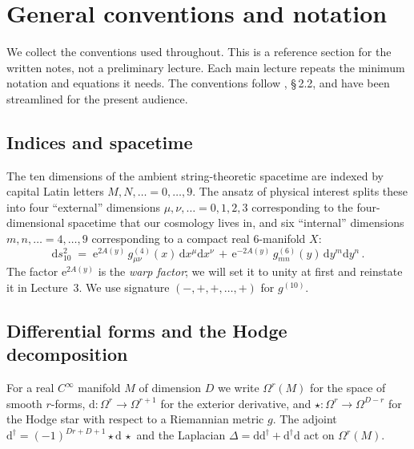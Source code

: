 
\section{General conventions and notation}\label{sec:conventions}


We collect the conventions used throughout. This is a reference
section for the written notes, not a preliminary lecture. Each main
lecture repeats the minimum notation and equations it needs. The
conventions follow \cite{McAllister:2025qwq}, \S\,2.2, and have
been streamlined for the present audience.

\subsection{Indices and spacetime}

The ten dimensions of the ambient string-theoretic spacetime are
indexed by capital Latin letters $M,N,\ldots = 0,\ldots,9$. The
ansatz of physical interest splits these into four ``external''
dimensions $\mu,\nu,\ldots = 0,1,2,3$ corresponding to the
four-dimensional spacetime that our cosmology lives in, and six
``internal'' dimensions $m,n,\ldots = 4,\ldots,9$ corresponding to a
compact real $6$-manifold $X$:
\begin{equation}\label{eq:ansatz}
    \mathrm{d}s^2_{10} \;=\; \mathrm{e}^{2A(y)}\, g^{(4)}_{\mu\nu}(x)\,\mathrm{d}x^\mu \mathrm{d}x^\nu
        \,+\, \mathrm{e}^{-2A(y)}\,g^{(6)}_{mn}(y)\,\mathrm{d}y^m \mathrm{d}y^n \,.
\end{equation}
The factor $\mathrm{e}^{2A(y)}$ is the \emph{warp factor}; we will set it to
unity at first and reinstate it in Lecture~3. We use signature
$(-,+,+,\ldots,+)$ for $g^{(10)}$.

\subsection{Differential forms and the Hodge decomposition}

For a real $C^\infty$ manifold $M$ of dimension $D$ we write
$\Omega^r(M)$ for the space of smooth $r$-forms,
$\mathrm{d}:\Omega^r\to
\Omega^{r+1}$ for the exterior derivative, and $\star:\Omega^r\to
\Omega^{D-r}$ for the Hodge star with respect to a Riemannian metric
$g$. The adjoint
$\mathrm{d}^\dagger = (-1)^{Dr+D+1}\star \mathrm{d}\,\star$ and the
Laplacian
$\Delta = \mathrm{d}\mathrm{d}^\dagger
+ \mathrm{d}^\dagger\mathrm{d}$ act on $\Omega^r(M)$.

